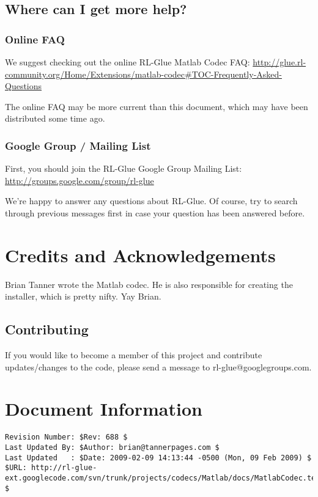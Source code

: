\documentclass[11pt]{article}
\begin{document}
\subsection{Where can I get more help?}
\subsubsection{Online FAQ}
We suggest checking out the online RL-Glue Matlab Codec FAQ:\newline
\url{http://glue.rl-community.org/Home/Extensions/matlab-codec#TOC-Frequently-Asked-Questions}

The online FAQ may be more current than this document, which may have been distributed some time ago.

\subsubsection{Google Group / Mailing List}
First, you should join the RL-Glue Google Group Mailing List:\newline
\url{http://groups.google.com/group/rl-glue}

We're happy to answer any questions about RL-Glue.  Of course, try to search through previous messages first in case your question has been answered before.


\section{Credits and Acknowledgements}
Brian Tanner wrote the Matlab codec. He is also responsible for creating the installer, which is pretty nifty.  Yay Brian.

\subsection{Contributing}
If you would like to become a member of this project and contribute updates/changes to the code, please send a message to rl-glue@googlegroups.com.


\section*{Document Information}
\begin{verbatim}
Revision Number: $Rev: 688 $
Last Updated By: $Author: brian@tannerpages.com $
Last Updated   : $Date: 2009-02-09 14:13:44 -0500 (Mon, 09 Feb 2009) $
$URL: http://rl-glue-ext.googlecode.com/svn/trunk/projects/codecs/Matlab/docs/MatlabCodec.tex $
\end{verbatim}
\end{document}

